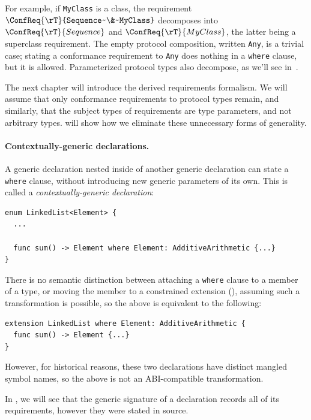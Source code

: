 \documentclass[../generics]{subfiles}
\begin{document}
For example, if \texttt{MyClass} is a class, the requirement $\ConfReq{\rT}{Sequence~\&~MyClass}$ decomposes into $\ConfReq{\rT}{Sequence}$ and $\ConfReq{\rT}{MyClass}$, the latter being a superclass requirement. The empty protocol composition, written \texttt{Any}, is a trivial case; stating a conformance requirement to \texttt{Any} does nothing in a \texttt{where} clause, but it is allowed. Parameterized protocol types also decompose, as we'll see in~.

The next chapter will introduce the derived requirements formalism. We will assume that only conformance requirements to protocol types remain, and similarly, that the subject types of requirements are type parameters, and not arbitrary types.  will show how we eliminate these unnecessary forms of generality.

\paragraph{Contextually-generic declarations.} A generic declaration nested inside of another generic declaration can state a \texttt{where} clause, without introducing new generic parameters of its own. This is called a \emph{contextually-generic declaration}:
\begin{Verbatim}
enum LinkedList<Element> {
  ...
  
  func sum() -> Element where Element: AdditiveArithmetic {...}
}
\end{Verbatim}
There is no semantic distinction between attaching a \texttt{where} clause to a member of a type, or moving the member to a constrained extension (), assuming such a transformation is possible, so the above is equivalent to the following:
\begin{Verbatim}
extension LinkedList where Element: AdditiveArithmetic {
  func sum() -> Element {...}
}
\end{Verbatim}
However, for historical reasons, these two declarations have distinct mangled symbol names, so the above is not an ABI-compatible transformation.

\medskip

In , we will see that the generic signature of a declaration records all of its requirements, however they were stated in source.
\end{document}

